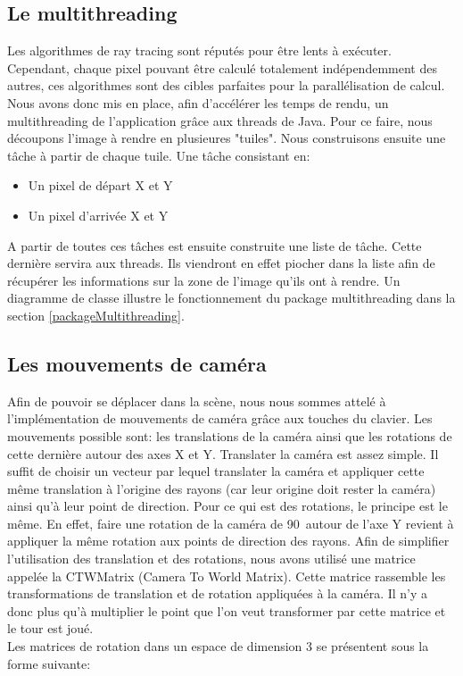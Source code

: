\documentclass[11pt]{article}
\begin{document}
\subsection{Le multithreading}
\label{multithreading}
Les algorithmes de ray tracing sont réputés pour être lents à exécuter. Cependant, chaque pixel pouvant être calculé totalement indépendemment des autres, ces algorithmes sont des cibles parfaites pour la parallélisation de calcul. Nous avons donc mis en place, afin d'accélérer les temps de rendu, un multithreading de l'application grâce aux threads de Java. Pour ce faire, nous découpons l'image à rendre en plusieures "tuiles". Nous construisons ensuite une tâche à partir de chaque tuile. Une tâche consistant en:
\begin{itemize}
	\item{Un pixel de départ X et Y}	
	\item{Un pixel d'arrivée X et Y}
\end{itemize}
A partir de toutes ces tâches est ensuite construite une liste de tâche. Cette dernière servira aux threads. Ils viendront en effet piocher dans la liste afin de récupérer les informations sur la zone de l'image qu'ils ont à rendre.
Un diagramme de classe illustre le fonctionnement du package multithreading dans la section \ref{packageMultithreading}.

\subsection{Les mouvements de caméra}
\label{mouvementsCamera}

Afin de pouvoir se déplacer dans la scène, nous nous sommes attelé à l'implémentation de mouvements de caméra grâce aux touches du clavier. Les mouvements possible sont: les translations de la caméra ainsi que les rotations de cette dernière autour des axes X et Y. Translater la caméra est assez simple. Il suffit de choisir un vecteur par lequel translater la caméra et appliquer cette même translation à l'origine des rayons (car leur origine doit rester la caméra) ainsi qu'à leur point de direction. Pour ce qui est des rotations, le principe est le même. En effet, faire une rotation de la caméra de 90\degree\ autour de l'axe Y revient à appliquer la même rotation aux points de direction des rayons. Afin de simplifier l'utilisation des translation et des rotations, nous avons utilisé une matrice appelée la CTWMatrix (Camera To World Matrix). Cette matrice rassemble les transformations de translation et de rotation appliquées à la caméra. Il n'y a donc plus qu'à multiplier le point que l'on veut transformer par cette matrice et le tour est joué.\\
Les matrices de rotation dans un espace de dimension 3 se présentent sous la forme suivante:
\end{document}
